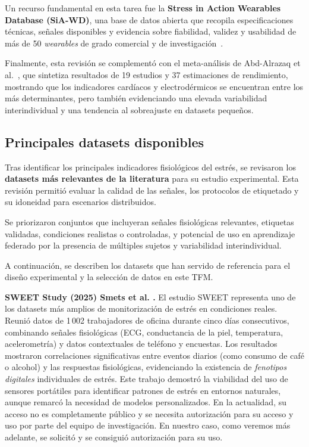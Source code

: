 \documentclass{report}
\begin{document}
Un recurso fundamental en esta tarea fue la \textbf{Stress in Action Wearables Database (SiA-WD)}, una base de datos abierta que recopila especificaciones técnicas, señales disponibles y evidencia sobre fiabilidad, validez y usabilidad de más de 50 \textit{wearables} de grado comercial y de investigación~\cite{SiA2025}.  

Finalmente, esta revisión se complementó con el meta-análisis de Abd-Alrazaq et al.~\cite{abd2024wearable}, que sintetiza resultados de 19 estudios y 37 estimaciones de rendimiento, mostrando que los indicadores cardíacos y electrodérmicos se encuentran entre los más determinantes, pero también evidenciando una elevada variabilidad interindividual y una tendencia al sobreajuste en datasets pequeños.


\subsection{Principales datasets disponibles}

Tras identificar los principales indicadores fisiológicos del estrés, se revisaron los \textbf{datasets más relevantes de la literatura} para su estudio experimental. Esta revisión permitió evaluar la calidad de las señales, los protocolos de etiquetado y su idoneidad para escenarios distribuidos.

Se priorizaron conjuntos que incluyeran señales fisiológicas relevantes, etiquetas validadas, condiciones realistas o controladas, y potencial de uso en aprendizaje federado por la presencia de múltiples sujetos y variabilidad interindividual.

A continuación, se describen los datasets que han servido de referencia para el diseño experimental y la selección de datos en este TFM.

\textbf{SWEET Study (2025) Smets et al. \cite{Smets2018DigitalPhenotypes}.}  
El estudio SWEET representa uno de los datasets más amplios de monitorización de estrés en condiciones reales. Reunió datos de 1\,002 trabajadores de oficina durante cinco días consecutivos, combinando señales fisiológicas (ECG, conductancia de la piel, temperatura, acelerometría) y datos contextuales de teléfono y encuestas.  
Los resultados mostraron correlaciones significativas entre eventos diarios (como consumo de café o alcohol) y las respuestas fisiológicas, evidenciando la existencia de \textit{fenotipos digitales} individuales de estrés.  
Este trabajo demostró la viabilidad del uso de sensores portátiles para identificar patrones de estrés en entornos naturales, aunque remarcó la necesidad de modelos personalizados. En la actualidad, su acceso no es completamente público y se necesita autorización para su acceso y uso por parte del equipo de investigación. En nuestro caso, como veremos más adelante, se solicitó y se consiguió autorización para su uso.
\end{document}
